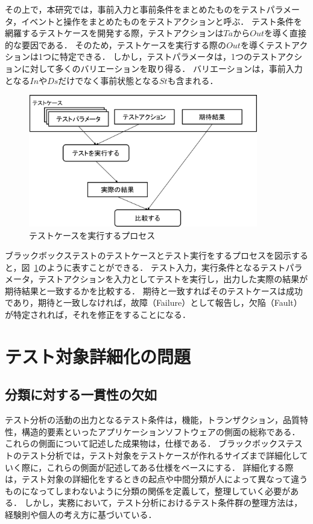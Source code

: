 その上で，本研究では，事前入力と事前条件をまとめたものをテストパラメータ，イベントと操作をまとめたものをテストアクションと呼ぶ\cite{yumoto2013-a}．
テスト条件を網羅するテストケースを開発する際，テストアクションは$Ta$から$Out$を導く直接的な要因である．
そのため，テストケースを実行する際の$Out$を導くテストアクションは1つに特定できる．
しかし，テストパラメータは，1つのテストアクションに対して多くのバリエーションを取り得る．
バリエーションは，事前入力となる$In$や$Ds$だけでなく事前状態となる$St$も含まれる．

\begin{figure}[h]
  \begin{center}
  \includegraphics[width=10cm]{./image/D-2-FigTCS.png}
  \caption{テストケースを実行するプロセス}
  \label{fig:D-4-FigTCS}
  \end{center}
\end{figure}

ブラックボックステストのテストケースとテスト実行をするプロセスを図示すると，図~\ref{fig:D-4-FigTCS}のように表すことができる．
テスト入力，実行条件となるテストパラメータ，テストアクションを入力としてテストを実行し，出力した実際の結果が期待結果と一致するかを比較する．
期待と一致すればそのテストケースは成功であり，期待と一致しなければ，故障（Failure）として報告し，欠陥（Fault）が特定されれば，それを修正をすることになる．




\newpage
\section{テスト対象詳細化の問題} \label{sec:2-2}
\subsection{分類に対する一貫性の欠如}
テスト分析の活動の出力となるテスト条件は，機能，トランザクション，品質特性，構造的要素といったアプリケーションソフトウェアの側面の総称である\cite{ISTQB}．
これらの側面について記述した成果物は，仕様である．
ブラックボックステストのテスト分析では，テスト対象をテストケースが作れるサイズまで詳細化していく際に，これらの側面が記述してある仕様をベースにする．
詳細化する際は，テスト対象の詳細化をするときの起点や中間分類が人によって異なって違うものになってしまわないように分類の関係を定義して，整理していく必要がある．
しかし，実務において，テスト分析におけるテスト条件群の整理方法は，経験則や個人の考え方に基づいている．

